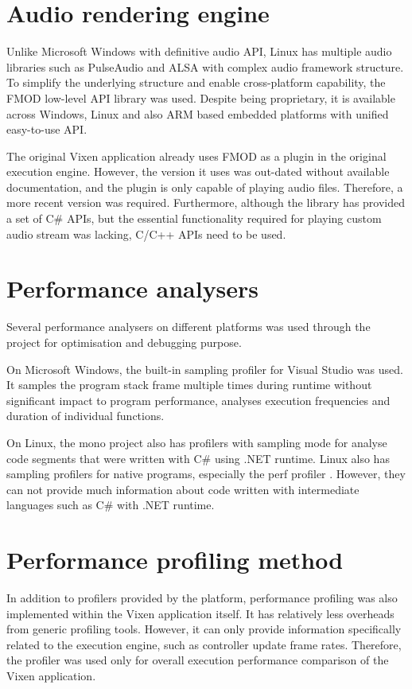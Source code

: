 \section{Audio rendering engine}

Unlike Microsoft Windows with definitive audio API, Linux has multiple audio libraries such as PulseAudio \cite{developers2013pulseaudio} and ALSA \cite{alsa} with complex audio framework structure. To simplify the underlying structure and enable cross-platform capability, the FMOD \cite{fmod} low-level API library was used. Despite being proprietary, it is available across Windows, Linux and also ARM based embedded platforms with unified easy-to-use API.

The original Vixen application already uses FMOD as a plugin in the original execution engine. However, the version it uses was out-dated without available documentation, and the plugin is only capable of playing audio files. Therefore, a more recent version was required. Furthermore, although the library has provided a set of C\# APIs, but the essential functionality required for playing custom audio stream was lacking, C/C++ APIs need to be used.

\section{Performance analysers}

Several performance analysers on different platforms was used through the project for optimisation and debugging purpose.

On Microsoft Windows, the built-in sampling profiler for Visual Studio was used. It samples the program stack frame multiple times during runtime without significant impact to program performance, analyses execution frequencies and duration of individual functions.

On Linux, the mono project also has profilers with sampling mode for analyse code segments that were written with C\# using .NET runtime. Linux also has sampling profilers for native programs, especially the perf profiler \cite{de2010new}. However, they can not provide much information about code written with intermediate languages such as C\# with .NET runtime.

\section{Performance profiling method}

In addition to profilers provided by the platform, performance profiling was also implemented within the Vixen application itself. It has relatively less overheads from generic profiling tools. However, it can only provide information specifically related to the execution engine, such as controller update frame rates. Therefore, the profiler was used only for overall execution performance comparison of the Vixen application.

